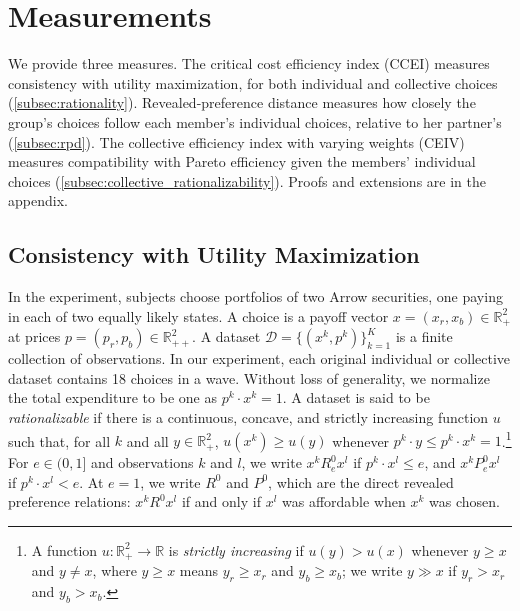 \documentclass[11 pt]{article}
\begin{document}

\section{Measurements}\label{sec:measurement}

We provide three measures. The critical cost efficiency index (CCEI) measures consistency with utility maximization, for both individual and collective choices (\autoref{subsec:rationality}). Revealed-preference distance measures how closely the group's choices follow each member's individual choices, relative to her partner's (\autoref{subsec:rpd}). The collective efficiency index with varying weights (CEIV) measures compatibility with Pareto efficiency given the members' individual choices (\autoref{subsec:collective_rationalizability}). Proofs and extensions are in the appendix.

\subsection{Consistency with Utility Maximization}\label{subsec:rationality}

In the experiment, subjects choose portfolios of two Arrow securities, one paying in each of two equally likely states. A choice is a payoff vector $x = (x_r,x_b) \in \mathbb{R}^2_{+}$ at prices $p = (p_r,p_b) \in \mathbb{R}^2_{++}$. A dataset $\mathcal D = \{(x^k,p^k)\}_{k=1}^K$ is a finite collection of observations. In our experiment, each original individual or collective dataset contains 18 choices in a wave. Without loss of generality, we normalize the total expenditure to be one as $p^k \cdot x^k = 1$. A dataset is said to be \emph{rationalizable} if there is a continuous, concave, and strictly increasing function $u$ such that, for all $k$ and all $y \in \mathbb{R}^2_{+}$, $u(x^{k}) \geq u(y)$ whenever $p^{k} \cdot y \leq p^{k} \cdot x^{k} = 1$.\footnote{A function $u : \mathbb{R}^2_{+} \to \mathbb{R}$ is \emph{strictly increasing} if $u(y) > u(x)$ whenever $y \geq x$ and $y \neq x$, where $y \geq x$ means $y_{r} \geq x_{r}$ and $y_{b} \geq x_{b}$; we write $y \gg x$ if $y_{r} > x_{r}$ and $y_{b} > x_{b}$.} For $e \in (0,1]$ and observations $k$ and $l$, we write $x^{k} \mathrel{R^{0}_{e}} x^{l}$ if $p^{k} \cdot x^{l} \leq e$, and $x^{k} \mathrel{P^{0}_{e}} x^{l}$ if $p^{k} \cdot x^{l} < e$. At $e = 1$, we write $R^{0}$ and $P^{0}$, which are the direct revealed preference relations: $x^{k} \mathrel{R^{0}} x^{l}$ if and only if $x^{l}$ was affordable when $x^{k}$ was chosen.
\end{document}
